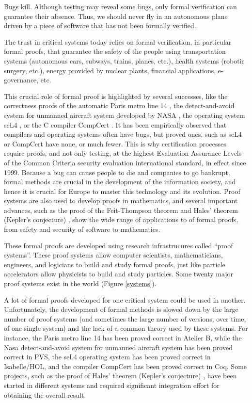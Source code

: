 \thispagestyle{empty}

Bugs kill. Although testing may reveal some bugs, only formal
verification can guarantee their absence.  Thus, we
should never fly in an autonomous plane driven by a piece of software
that has not been formally verified.

The trust in critical systems today relies on formal verification, in
particular formal proofs, that guarantee the safety of the people
using transportation systems (autonomous cars, subways, trains,
planes, etc.), health systems (robotic surgery, etc.), energy provided
by nuclear plants, financial applications, e-governance, etc.

This crucial role of formal proof is highlighted by several successes,
like the correctness proofs of the automatic Paris metro line 14
\cite{metro14}, the detect-and-avoid system for unmanned aircraft
system developed by NASA \cite{Munoz16}, the operating system seL4
\cite{Klein09}, or the C compiler CompCert \cite{Leroy06}.  It has
been empirically observed that compilers and operating systems often
have bugs, but proved ones, such as seL4 or CompCert have none, or much
fewer.  This is why certification processes require proofs, and not
only testing, at the highest Evaluation Assurance Levels of the Common
Criteria security evaluation international standard, in effect since
1999. Because a bug can cause people to die and companies to go bankrupt,
formal methods are crucial in the development of the
information society, and hence it is crucial for Europe to master this technology
and its evolution.  Proof systems are also used to develop proofs in
mathematics, and several important advances, such as the proof of the
Feit-Thompson theorem \cite{Gonthier13} and Hales' theorem (Kepler's
conjecture) \cite{Hales17}, show the wide range of applications to of
formal proofs, from safety and security of software to mathematics.

These formal proofs are developed using research infrastrucures called
``proof systems''.  These proof systems allow computer scientists,
mathematicians, engineers, and logicians to build and study formal
proofs, just like particle accelerators allow physicists to build and
study particles.  Some twenty major proof systems exist in the world
(Figure \ref{systems}).

A lot of formal proofs developed for one critical system could be used
in another.  Unfortunately, the development of formal methods is
slowed down by the large number of proof systems (and sometimes the
large number of versions, over time, of one single system) and the
lack of a common theory used by these systems.  For instance, the
Paris metro line 14 has been proved correct in Atelier B, while the
Nasa detect-and-avoid system for unmanned aircraft system has been
proved correct in PVS, the seL4 operating system has been proved
correct in Isabelle/HOL, and the compiler CompCert has been proved
correct in Coq.  Some projects, such as the proof of Hales' theorem
(Kepler's conjecture) \cite{Hales17}, have been started in different
systems and required significant integration effort for obtaining the
overall result.


